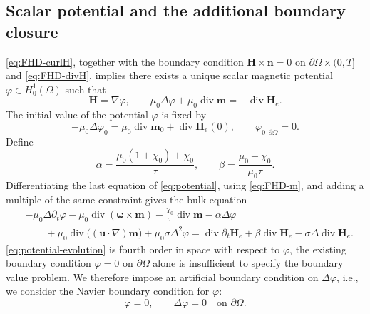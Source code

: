 \documentclass[11pt,a4paper]{article}
\newcommand{\bs}{\boldsymbol}
\DeclareMathOperator{\ddiv}{div}
\newcommand{\Div}{\ddiv}
\theoremstyle{definition}
\numberwithin{equation}{section}
\begin{document}
\subsection{Scalar potential and the additional boundary closure}\label{subsec:boundary}
\cref{eq:FHD-curlH}, together with the boundary condition $\bs H\times\bs n=0$ on $\partial\Omega\times (0,T]$ and \cref{eq:FHD-divH}, implies there exists a unique scalar magnetic potential $\varphi \in H_0^1(\Omega)$ such that 
\begin{equation}\label{eq:potential}
 \bs H=\nabla\varphi,\qquad
 \mu_0\Delta\varphi+\mu_0\Div\bs m=-\Div\bs H_e.
\end{equation}
The initial value of the potential $\varphi$ is fixed by
\begin{equation}\label{eq:phi0}
 -\mu_0\Delta\varphi_0=\mu_0\Div\bs m_0+\Div\bs H_e(0),
 \qquad\varphi_0|_{\partial\Omega}=0.
\end{equation}
Define
\begin{equation}\label{eq:abeta}
 \alpha =\frac{\mu_0(1+\chi_0)+\chi_0}{\tau},\qquad
 \beta=\frac{\mu_0+\chi_0}{\mu_0\tau}.
\end{equation}
Differentiating the last equation of \eqref{eq:potential}, using \eqref{eq:FHD-m}, and adding a multiple of the same constraint gives the bulk equation
\begin{equation}\label{eq:potential-evolution}
\begin{aligned}
 &-\mu_0\Delta\partial_t\varphi-\mu_0\Div(\bs\omega\times\bs m)
 -\frac{\chi_0}{\tau}\Div\bs m-\alpha\Delta\varphi\\
 &\qquad+\mu_0\Div\bigl((\bs u\cdot\nabla)\bs m\bigr)+\mu_0\sigma\Delta^2\varphi
 =\Div\partial_t\bs H_e+\beta\Div\bs H_e-\sigma\Delta\Div\bs H_e.
\end{aligned}
\end{equation} 
\cref{eq:potential-evolution} is fourth order in space with respect to $\varphi$, the existing boundary condition $\varphi = 0$ on $\partial\Omega$ alone is insufficient to specify the boundary value problem. We therefore impose an artificial boundary condition on $\Delta\varphi$, i.e., we consider the Navier boundary condition for $\varphi$:
\begin{equation}\label{eq:navier}
 \varphi=0,\qquad \Delta\varphi=0\quad\text{on }\partial\Omega.
\end{equation}
\end{document}
